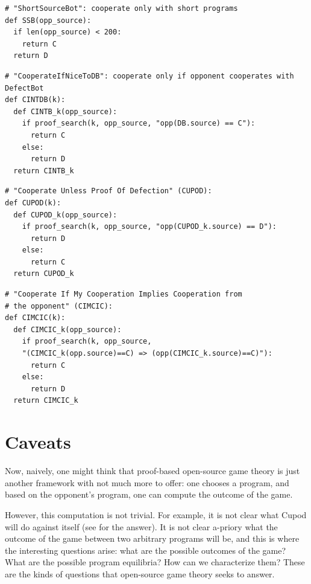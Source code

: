 \documentclass{article}
\begin{document}
\begin{verbatim}
# "ShortSourceBot": cooperate only with short programs
def SSB(opp_source):
  if len(opp_source) < 200:
    return C
  return D
\end{verbatim}

\begin{verbatim}
# "CooperateIfNiceToDB": cooperate only if opponent cooperates with DefectBot
def CINTDB(k):
  def CINTB_k(opp_source):
    if proof_search(k, opp_source, "opp(DB.source) == C"):
      return C
    else:
      return D
  return CINTB_k
\end{verbatim}

\newcommand{\cupod}{\Verb{CUPOD(k)}\xspace}
\begin{verbatim}
# "Cooperate Unless Proof Of Defection" (CUPOD):
def CUPOD(k):
  def CUPOD_k(opp_source):
    if proof_search(k, opp_source, "opp(CUPOD_k.source) == D"):
      return D
    else:
      return C
  return CUPOD_k
\end{verbatim}

\begin{verbatim}
# "Cooperate If My Cooperation Implies Cooperation from
# the opponent" (CIMCIC):
def CIMCIC(k):
  def CIMCIC_k(opp_source):
    if proof_search(k, opp_source,
    "(CIMCIC_k(opp.source)==C) => (opp(CIMCIC_k.source)==C)"):
      return C
    else:
      return D
  return CIMCIC_k
\end{verbatim} 

\section{Caveats}
Now, naively, one might think that proof-based open-source game theory is just another framework with not much more to offer: one chooses a program, and based on the opponent's program, one can compute the outcome of the game. 

However, this computation is not trivial. For example, it is not clear what Cupod will do against itself (see \cite{critch2022cooperativeuncooperativeinstitutiondesigns} for the answer). It is not clear a-priory what the outcome of the game between two arbitrary programs will be, and this is where the interesting questions arise: what are the possible outcomes of the game? What are the possible program equilibria? How can we characterize them? These are the kinds of questions that open-source game theory seeks to answer.


\printbibliography
\end{document}
